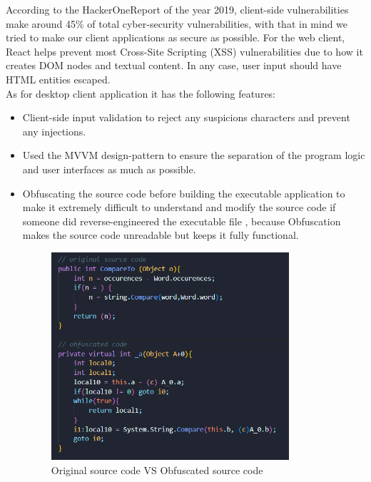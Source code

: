 \documentclass[]{uc2pfecaneva}
\begin{document}
    \hspace*{8mm}  According to the HackerOneReport of the year 2019,  client-side vulnerabilities  make around 45\%  of total cyber-security  vulnerabilities,  with that in mind we tried to make our  client applications as secure as possible.
    For the web client, React helps prevent most Cross-Site Scripting (XSS) vulnerabilities due to how it creates DOM nodes and textual content.
    In any case, user input should have HTML entities escaped. \\
    \parindent  As for desktop client application it has the following features:
    \begin{itemize}
        \item Client-side input validation to reject any suspicions characters  and prevent any injections.
        \item Used the MVVM design-pattern to ensure the separation of the program logic and user interfaces as much as possible.
        \item Obfuscating the source code before building the executable application to make it extremely difficult to understand and modify the source code if someone did reverse-engineered the executable file , because Obfuscation makes the source code unreadable but keeps it fully functional.

        \begin{figure}[h]
            \centering
            \includegraphics[width=250pt]{images/obs}
            \caption{Original source code VS Obfuscated source code}
        \end{figure}


\end{itemize}
\end{document}
